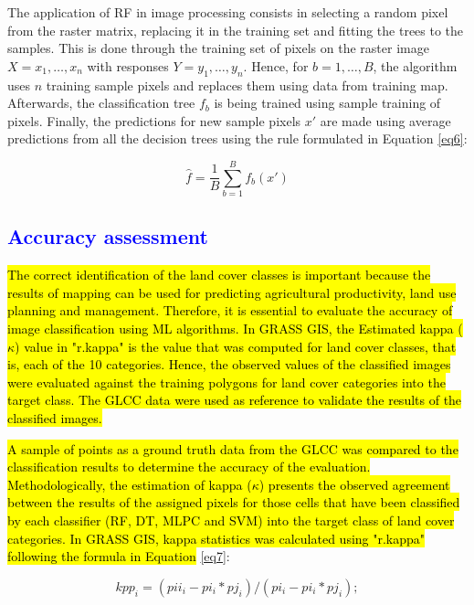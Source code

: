 \documentclass[final,5p,times,twocolumn]{elsarticle}
\numberwithin{table}{section}
\begin{document}
The application of RF in image processing consists in selecting a random pixel from the raster matrix, replacing it in the training set and fitting the trees to the samples. This is done through the training set of pixels on the raster image $X = x_{1},\dots, x_{n}$ with responses $Y = y_{1}, \dots, y_{n}$. Hence, for $b = 1, \dots, B$, the algorithm uses $n$ training sample pixels and replaces them using data from training map. Afterwards, the classification tree $f_b$ is being trained using sample training of pixels. Finally, the predictions for new sample pixels $x'$ are made using average predictions from all the decision trees using the rule formulated in Equation \ref{eq6}: 

\begin{equation}
\hat f=\frac{1}{B}\sum_{b=1}^{B}f_{b}(x')
\label{eq6}
\end{equation}

\subsection{\textcolor{blue}{Accuracy assessment}}

\hl{The correct identification of the land cover classes is important because the results of mapping can be used for predicting agricultural productivity, land use planning and management. Therefore, it is essential to evaluate the accuracy of image classification using ML algorithms. In GRASS GIS, the Estimated kappa ($\kappa$) value in "r.kappa" is the value that was computed for land cover classes, that is, each of the 10 categories. Hence, the observed values of the classified images were evaluated against the training polygons for land cover categories into the target class. The GLCC data were used as reference to validate the results of the classified images. }

\hl{A sample of points as a ground truth data from the GLCC was compared to the classification results to determine the accuracy of the evaluation. Methodologically, the estimation of kappa ($\kappa$) presents the observed agreement between the results of the assigned pixels for those cells that have been classified by each classifier (RF, DT, MLPC and SVM) into the target class of land cover categories. In GRASS GIS, kappa statistics was calculated using "r.kappa" following the formula in Equation} \ref{eq7}: 

\begin{equation}
kpp_i = (pii_i - pi_i * pj_i) / (pi_i - pi_i * pj_i); 
\label{eq7}
\end{equation}
\end{document}
